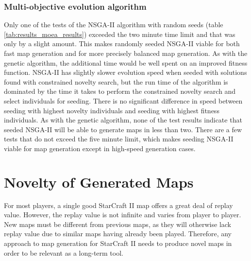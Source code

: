 \subsubsection{Multi-objective evolution algorithm}
Only one of the tests of the NSGA-II algorithm with random seeds (table \ref{tab:results_moea_results}) exceeded the two minute time limit and that was only by a slight amount. This makes randomly seeded NSGA-II viable for both fast map generation and for more precisely balanced map generation. As with the genetic algorithm, the additional time would be well spent on an improved fitness function. NSGA-II has slightly slower evolution speed when seeded with solutions found with constrained novelty search, but the run time of the algorithm is dominated by the time it takes to perform the constrained novelty search and select individuals for seeding. There is no significant difference in speed between seeding with highest novelty individuals and seeding with highest fitness individuals. As with the genetic algorithm, none of the test results indicate that seeded NSGA-II will be able to generate maps in less than two. There are a few tests that do not exceed the five minute limit, which makes seeding NSGA-II viable for map generation except in high-speed generation cases.

\section{Novelty of Generated Maps}
\label{discussion_novelty}
For most players, a single good StarCraft II map offers a great deal of replay value. However, the replay value is not infinite and varies from player to player. New maps must be different from previous maps, as they will otherwise lack replay value due to similar maps having already been played. Therefore, any approach to map generation for StarCraft II needs to produce novel maps in order to be relevant as a long-term tool.

